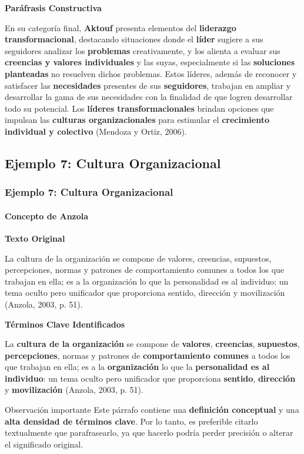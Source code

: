 \documentclass[aspectratio=169]{beamer}
\begin{document}
\begin{frame}[allowframebreaks]
	\framebreak
	
	\textbf{Paráfrasis Constructiva}
	\begin{block}{}
		\small
		En su categoría final, \textbf{Aktouf} presenta elementos del \textbf{liderazgo transformacional}, destacando situaciones donde el \textbf{líder} sugiere a sus seguidores analizar los \textbf{problemas} creativamente, y los alienta a evaluar sus \textbf{creencias y valores individuales} y las suyas, especialmente si las \textbf{soluciones planteadas} no resuelven dichos problemas. Estos líderes, además de reconocer y satisfacer las \textbf{necesidades} presentes de sus \textbf{seguidores}, trabajan en ampliar y desarrollar la gama de sus necesidades con la finalidad de que logren desarrollar todo su potencial. Los \textbf{líderes transformacionales} brindan opciones que impulsan las \textbf{culturas organizacionales} para estimular el \textbf{crecimiento individual y colectivo} (Mendoza y Ortiz, 2006).
	\end{block}
\end{frame}

\subsection{Ejemplo 7: Cultura Organizacional}

\begin{frame}[allowframebreaks]
	\frametitle{Ejemplo 7: Cultura Organizacional}
	\framesubtitle{Concepto de Anzola}
	
	\textbf{Texto Original}
	\begin{block}{}
		\small
		La cultura de la organización se compone de valores, creencias, supuestos, percepciones, normas y patrones de comportamiento comunes a todos los que trabajan en ella; es a la organización lo que la personalidad es al individuo: un tema oculto pero unificador que proporciona sentido, dirección y movilización (Anzola, 2003, p. 51).
	\end{block}
	
	\framebreak
	
	\textbf{Términos Clave Identificados}
	\begin{block}{}
		\small
		La \textbf{cultura de la organización} se compone de \textbf{valores}, \textbf{creencias}, \textbf{supuestos}, \textbf{percepciones}, normas y patrones de \textbf{comportamiento comunes} a todos los que trabajan en ella; es a la \textbf{organización} lo que la \textbf{personalidad es al individuo}: un tema oculto pero unificador que proporciona \textbf{sentido}, \textbf{dirección} y \textbf{movilización} (Anzola, 2003, p. 51).
	\end{block}
	
	\framebreak
	
	\begin{alertblock}{Observación importante}
		Este párrafo contiene una \textbf{definición conceptual} y una \textbf{alta densidad de términos clave}. Por lo tanto, \alert{es preferible citarlo textualmente} que parafrasearlo, ya que hacerlo podría perder precisión o alterar el significado original.
	\end{alertblock}
\end{frame}
\end{document}
